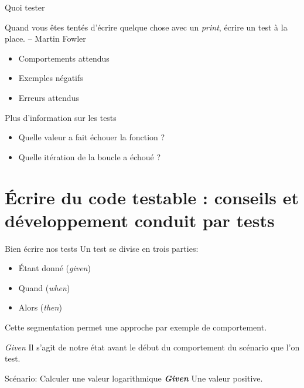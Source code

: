\documentclass[11pt]{beamer}
\begin{document}
\begin{frame}{Quoi tester}
\begin{block}{}
Quand vous êtes tentés d'écrire quelque chose avec un \textit{print}, écrire un test à la place. -- Martin Fowler
\end{block}
\begin{itemize}
\item Comportements attendus
\item Exemples négatifs
\item Erreurs attendus
\end{itemize}
\end{frame}

\begin{frame}{Plus d'information sur les tests}
\begin{itemize}
\item Quelle valeur a fait échouer la fonction ?
\item Quelle itération de la boucle a échoué ?
\end{itemize}
\end{frame}

\section[Écrire du code testable : conseils et développement conduit par tests]{Écrire du code testable : conseils et développement conduit par tests}

\begin{frame}{Bien écrire nos tests}
Un test se divise en trois parties:
\begin{itemize}
	\item Étant donné (\textit{given})
	\item Quand (\textit{when})
	\item Alors (\textit{then})
\end{itemize}
Cette segmentation permet une approche par exemple de comportement.

\end{frame}

\begin{frame}{\textit{Given}}
Il s'agit de notre état avant le début du comportement du scénario que l'on test.

\begin{block}{Scénario: Calculer une valeur logarithmique}
\textit{\textbf{Given}} Une valeur positive.
\end{block}
\end{frame}
\end{document}

